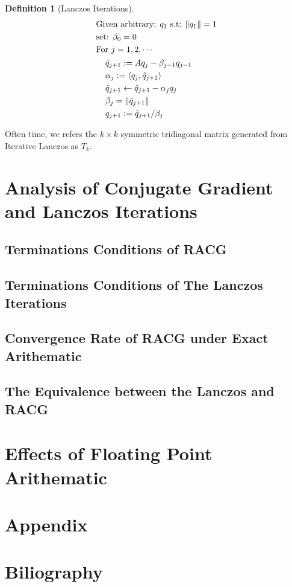 \documentclass[]{article}
\theoremstyle{definition}
\newtheorem{definition}{Definition}
\begin{document}
        \begin{definition}[Lanczos Iterations]
            \begin{align}
                & \text{Given arbitrary: } q_1 \text{ s.t: } \Vert q_1\Vert = 1
                \\
                & \text{set: }\beta_0 = 0
                \\
                & \text{For } j = 1, 2, \cdots 
                \\
                &\hspace{1.1em}\begin{aligned}
                    & \tilde{q}_{j + 1} := Aq_j - \beta_{j - 1}q_{j - 1}
                    \\
                    & \alpha_j := \langle q_j,\tilde{q}_{j + 1}\rangle
                    \\
                    & \tilde{q}_{j + 1} \leftarrow \tilde{q}_{j + 1} - \alpha_j q_j
                    \\
                    & \beta_j = \Vert \tilde{q}_{j + 1}\Vert
                    \\
                    & q_{j + 1} := \tilde{q}_{j + 1}/\beta_j
                \end{aligned}
            \end{align}
        \end{definition}
        Often time, we refers the $k\times k$ symmetric tridiagonal matrix generated from Iterative Lanczos as $T_k$. 

        
\section{Analysis of Conjugate Gradient and Lanczos Iterations}
    \subsection{Terminations Conditions of RACG}
    \subsection{Terminations Conditions of The Lanczos Iterations}
    \subsection{Convergence Rate of RACG under Exact Arithematic}
    \subsection{The Equivalence between the Lanczos and RACG}

\section{Effects of Floating Point Arithematic}
\section{Appendix}
\section{Biliography}
            
            
\end{document}
